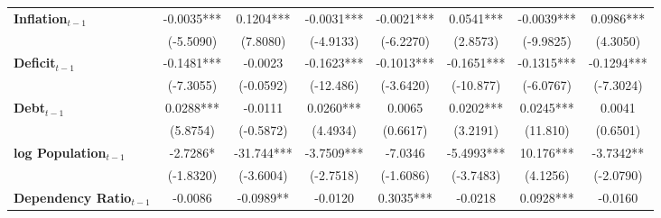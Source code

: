 \begin{center}
\begin{tabular}{lccccccc}
\textbf{Inflation$_{t-1}$}      &      -0.0035***      &          0.1204***          &          -0.0031***          &              -0.0021***             &            0.0541***             &          -0.0039***         &           0.0986***            \\
\textbf{ }                         &      (-5.5090)       &           (7.8080)          &          (-4.9133)           &              (-6.2270)              &             (2.8573)             &          (-9.9825)          &            (4.3050)            \\
\textbf{Deficit$_{t-1}$}             &      -0.1481***      &           -0.0023           &          -0.1623***          &              -0.1013***             &            -0.1651***            &          -0.1315***         &           -0.1294***           \\
\textbf{ }                         &      (-7.3055)       &          (-0.0592)          &          (-12.486)           &              (-3.6420)              &            (-10.877)             &          (-6.0767)          &           (-7.3024)            \\
\textbf{Debt$_{t-1}$}                &      0.0288***       &           -0.0111           &          0.0260***           &                0.0065               &            0.0202***             &          0.0245***          &             0.0041             \\
\textbf{ }                         &       (5.8754)       &          (-0.5872)          &           (4.4934)           &               (0.6617)              &             (3.2191)             &           (11.810)          &            (0.6501)            \\
\textbf{log Population$_{t-1}$}      &       -2.7286*       &          -31.744***         &          -3.7509***          &               -7.0346               &            -5.4993***            &          10.176***          &           -3.7342**            \\
\textbf{ }                         &      (-1.8320)       &          (-3.6004)          &          (-2.7518)           &              (-1.6086)              &            (-3.7483)             &           (4.1256)          &           (-2.0790)            \\
\textbf{Dependency Ratio$_{t-1}$}   &       -0.0086        &          -0.0989**          &           -0.0120            &              0.3035***              &             -0.0218              &          0.0928***          &            -0.0160             \\

\end{tabular}
\end{center}
